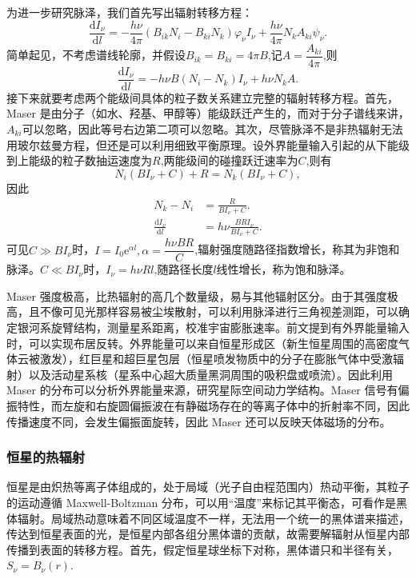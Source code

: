 \documentclass[../天体物理基础.tex]{subfiles}
\begin{document}
为进一步研究脉泽，我们首先写出辐射转移方程：
\begin{equation}
\frac{\mathrm{d}I_{\nu}}{\mathrm{d}l}=-\frac{h\nu}{4\pi}\left(B_{ik}N_{i}-B_{ki}N_{k}\right)\varphi_{\nu}I_{\nu}+\frac{h\nu}{4\pi}N_{k}A_{ki}\psi_{\nu}.
\end{equation}
简单起见，不考虑谱线轮廓，并假设$B_{ik}=B_{ki}=4\pi B$,记$A=\dfrac{A_{ki}}{4\pi}$,则
\begin{equation}
\frac{\mathrm{d}I_{\nu}}{\mathrm{d}l}=-h\nu B\left(N_{i}-N_{k}\right)I_{\nu}+h\nu N_{k}A.
\end{equation}
接下来就要考虑两个能级间具体的粒子数关系建立完整的辐射转移方程。首先，Maser 是由分子（如水、羟基、甲醇等）能级跃迁产生的，而对于分子谱线来讲，$A_{ki}$可以忽略，因此等号右边第二项可以忽略。其次，尽管脉泽不是非热辐射无法用玻尔兹曼方程，但还是可以利用细致平衡原理。设外界能量输入引起的从下能级到上能级的粒子数抽运速度为$R$,两能级间的碰撞跃迁速率为$C$,则有
\begin{equation}
N_{i}\left(BI_{\nu}+C\right)+R=N_{k}\left(BI_{\nu}+C\right),
\end{equation}
因此
\begin{align}
N_{k}-N_{i}&=\frac{R}{BI_{\nu}+C}.\\
\frac{\mathrm{d}I_{\nu}}{\mathrm{d}l}&=h\nu \frac{BRI_{\nu}}{BI_{\nu}+C}.
\end{align}
可见$C\gg BI_{\nu}$时，$I=I_{0}\mathrm{e}^{\alpha l},\alpha=\dfrac{h\nu BR}{C}$,辐射强度随路径指数增长，称其为非饱和脉泽。$C\ll BI_{\nu}$时，$I_{\nu}=h\nu Rl$,随路径长度$l$线性增长，称为饱和脉泽。

Maser 强度极高，比热辐射的高几个数量级，易与其他辐射区分。由于其强度极高，且不像可见光那样容易被尘埃散射，可以利用脉泽进行三角视差测距，可以确定银河系旋臂结构，测量星系距离，校准宇宙膨胀速率。前文提到有外界能量输入时，可以实现布居反转。外界能量可以来自恒星形成区（新生恒星周围的高密度气体云被激发），红巨星和超巨星包层（恒星喷发物质中的分子在膨胀气体中受激辐射）以及活动星系核（星系中心超大质量黑洞周围的吸积盘或喷流）。因此利用 Maser 的分布可以分析外界能量来源，研究星际空间动力学结构。Maser 信号有偏振特性，而左旋和右旋圆偏振波在有静磁场存在的等离子体中的折射率不同，因此传播速度不同，会发生偏振面旋转，因此 Maser 还可以反映天体磁场的分布。

\subsubsection{恒星的热辐射}
恒星是由炽热等离子体组成的，处于局域（光子自由程范围内）热动平衡，其粒子的运动遵循 Maxwell-Boltzman 分布，可以用“温度”来标记其平衡态，可看作是黑体辐射。局域热动意味着不同区域温度不一样，无法用一个统一的黑体谱来描述，传达到恒星表面的光，是恒星内部各组分黑体谱的贡献，故需要解辐射从恒星内部传播到表面的转移方程。首先，假定恒星球坐标下对称，黑体谱只和半径有关，$S_{\nu}=B_{\nu}\left(r\right)$.
\end{document}
